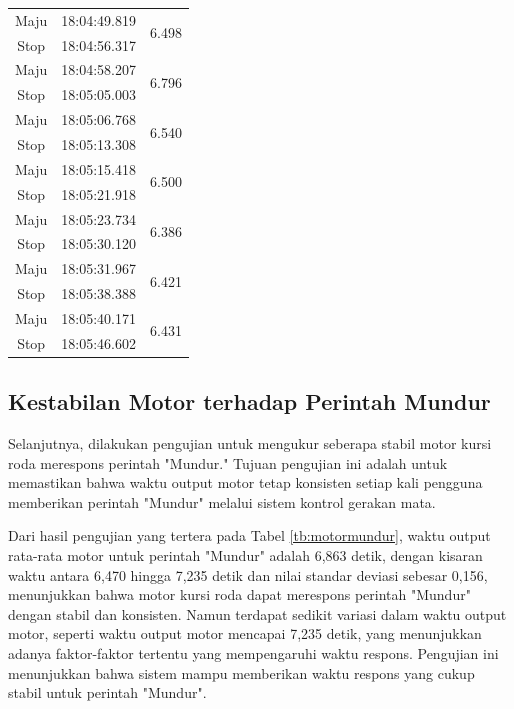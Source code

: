 \begin{longtable}{|c|c|c|}
  Maju           & 18:04:49.819        & \multirow{2}{*}{6.498}  \\ \cline{1-2}
  Stop           & 18:04:56.317        &                         \\ \hline
  Maju           & 18:04:58.207        & \multirow{2}{*}{6.796}  \\ \cline{1-2}
  Stop           & 18:05:05.003        &                         \\ \hline
  Maju           & 18:05:06.768        & \multirow{2}{*}{6.540}  \\ \cline{1-2}
  Stop           & 18:05:13.308        &                         \\ \hline
  Maju           & 18:05:15.418        & \multirow{2}{*}{6.500}  \\ \cline{1-2}
  Stop           & 18:05:21.918        &                         \\ \hline
  Maju           & 18:05:23.734        & \multirow{2}{*}{6.386}  \\ \cline{1-2}
  Stop           & 18:05:30.120        &                         \\ \hline
  Maju           & 18:05:31.967        & \multirow{2}{*}{6.421}  \\ \cline{1-2}
  Stop           & 18:05:38.388        &                         \\ \hline
  Maju           & 18:05:40.171        & \multirow{2}{*}{6.431}  \\ \cline{1-2}
  Stop           & 18:05:46.602        &                         \\ \hline
\end{longtable}

\subsection{Kestabilan Motor terhadap Perintah Mundur}

Selanjutnya, dilakukan pengujian untuk mengukur seberapa stabil motor kursi roda merespons perintah "Mundur." Tujuan pengujian ini adalah untuk memastikan bahwa waktu output motor tetap konsisten setiap kali pengguna memberikan perintah "Mundur" melalui sistem kontrol gerakan mata. 

Dari hasil pengujian yang tertera pada Tabel \ref{tb:motormundur}, waktu output rata-rata motor untuk perintah "Mundur" adalah 6,863 detik, dengan kisaran waktu antara 6,470 hingga 7,235 detik dan nilai standar deviasi sebesar 0,156, menunjukkan bahwa motor kursi roda dapat merespons perintah "Mundur" dengan stabil dan konsisten. Namun terdapat sedikit variasi dalam waktu output motor, seperti waktu output motor mencapai 7,235 detik, yang menunjukkan adanya faktor-faktor tertentu yang mempengaruhi waktu respons. Pengujian ini menunjukkan bahwa sistem mampu memberikan waktu respons yang cukup stabil untuk perintah "Mundur".

